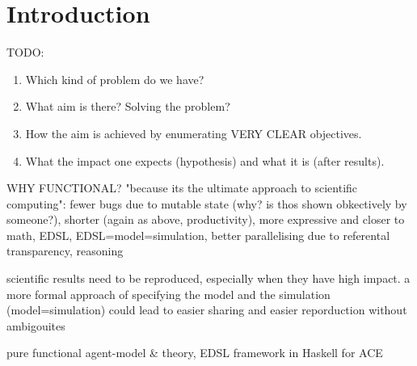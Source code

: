 \documentclass{article}
\begin{document}


\section{Introduction}

TODO:
\begin{enumerate}
\item Which kind of problem do we have?
\item What aim is there? Solving the problem? 
\item How the aim is achieved by enumerating VERY CLEAR objectives.
\item What the impact one expects (hypothesis) and what it is (after results).
\end{enumerate}

WHY FUNCTIONAL? "because its the ultimate approach to scientific computing": fewer bugs due to mutable state (why? is thos shown obkectively by someone?), shorter (again as above, productivity), more expressive and closer to math, EDSL, EDSL=model=simulation, better parallelising due to referental transparency, reasoning

scientific results need to be reproduced, especially when they have high impact. a more formal approach of specifying the model and the simulation (model=simulation) could lead to easier sharing and easier reporduction without ambigouites

pure functional agent-model \& theory, EDSL framework in Haskell for ACE
\end{document}
